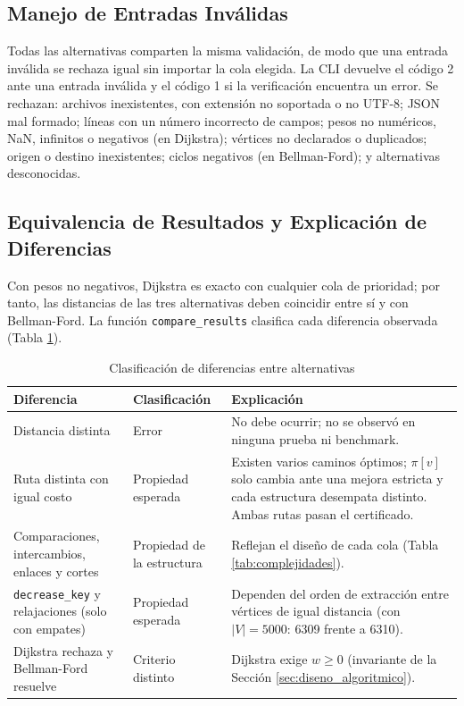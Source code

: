 

\subsection{Manejo de Entradas Inválidas}
Todas las alternativas comparten la misma validación, de modo que una entrada inválida se rechaza igual sin importar la cola elegida. La CLI devuelve el código 2 ante una entrada inválida y el código 1 si la verificación encuentra un error. Se rechazan: archivos inexistentes, con extensión no soportada o no UTF-8; JSON mal formado; líneas con un número incorrecto de campos; pesos no numéricos, NaN, infinitos o negativos (en Dijkstra); vértices no declarados o duplicados; origen o destino inexistentes; ciclos negativos (en Bellman-Ford); y alternativas desconocidas.

\subsection{Equivalencia de Resultados y Explicación de Diferencias}
Con pesos no negativos, Dijkstra es exacto con cualquier cola de prioridad; por tanto, las distancias de las tres alternativas deben coincidir entre sí y con Bellman-Ford. La función \texttt{compare\_results} clasifica cada diferencia observada (Tabla \ref{tab:clasificacion_diferencias}).

\begin{table}[H]
    \caption{Clasificación de diferencias entre alternativas}
    \label{tab:clasificacion_diferencias}
    \begin{tabularx}{\textwidth}{@{}>{\raggedright\arraybackslash}p{4.6cm}>{\raggedright\arraybackslash}p{2.8cm}X@{}}
        \toprule
        \textbf{Diferencia} & \textbf{Clasificación} & \textbf{Explicación} \\
        \midrule
        Distancia distinta & Error & No debe ocurrir; no se observó en ninguna prueba ni benchmark. \\
        Ruta distinta con igual costo & Propiedad esperada & Existen varios caminos óptimos; $\pi[v]$ solo cambia ante una mejora estricta y cada estructura desempata distinto. Ambas rutas pasan el certificado. \\
        Comparaciones, intercambios, enlaces y cortes & Propiedad de la estructura & Reflejan el diseño de cada cola (Tabla \ref{tab:complejidades}). \\
        \texttt{decrease\_key} y relajaciones (solo con empates) & Propiedad esperada & Dependen del orden de extracción entre vértices de igual distancia (con $|V|=5000$: 6309 frente a 6310). \\
        Dijkstra rechaza y Bellman-Ford resuelve & Criterio distinto & Dijkstra exige $w \ge 0$ (invariante de la Sección \ref{sec:diseno_algoritmico}). \\
        \bottomrule
    \end{tabularx}
\end{table}

